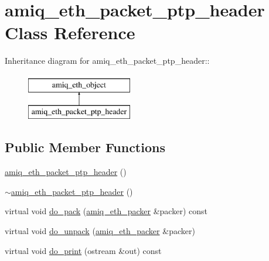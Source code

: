 \hypertarget{classamiq__eth__packet__ptp__header}{
\section{amiq\_\-eth\_\-packet\_\-ptp\_\-header Class Reference}
\label{classamiq__eth__packet__ptp__header}
}
Inheritance diagram for amiq\_\-eth\_\-packet\_\-ptp\_\-header::\begin{figure}[H]
\begin{center}
\leavevmode
\includegraphics[height=2cm]{classamiq__eth__packet__ptp__header}
\end{center}
\end{figure}
\subsection*{Public Member Functions}
\begin{DoxyCompactItemize}
\item 
\hyperlink{classamiq__eth__packet__ptp__header_a4c7b83f795d49fb4ea8c4d84a9d8a5e1}{amiq\_\-eth\_\-packet\_\-ptp\_\-header} ()
\item 
\hyperlink{classamiq__eth__packet__ptp__header_aaad24bd23da748697622c571a00628fa}{$\sim$amiq\_\-eth\_\-packet\_\-ptp\_\-header} ()
\item 
virtual void \hyperlink{classamiq__eth__packet__ptp__header_ad850767754579cc65075215571e59d85}{do\_\-pack} (\hyperlink{classamiq__eth__packer}{amiq\_\-eth\_\-packer} \&packer) const 
\item 
virtual void \hyperlink{classamiq__eth__packet__ptp__header_a50b81480d0408ec14a9634e0bc888b4e}{do\_\-unpack} (\hyperlink{classamiq__eth__packer}{amiq\_\-eth\_\-packer} \&packer)
\item 
virtual void \hyperlink{classamiq__eth__packet__ptp__header_a2cf47a7607074bea8c5977e6beb26389}{do\_\-print} (ostream \&out) const 
\end{DoxyCompactItemize}

